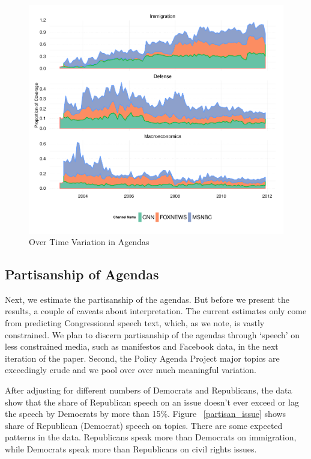 \documentclass[12pt, letterpaper]{article}
\begin{document}
\begin{figure}[H]
\centering
\caption{Over Time Variation in Agendas}\label{over_time}
\includegraphics[width=1\textwidth]{../figs/topic_channel_time.pdf}
\end{figure}

\subsection*{Partisanship of Agendas}

Next, we estimate the partisanship of the agendas. But before we present the results, a couple of caveats about interpretation. The current estimates only come from predicting Congressional speech text, which, as we note, is vastly constrained. We plan to discern partisanship of the agendas through `speech' on less constrained media, such as manifestos and Facebook data, in the next iteration of the paper. Second, the Policy Agenda Project major topics are exceedingly crude and we pool over over much meaningful variation.

After adjusting for different numbers of Democrats and Republicans, the data show that the share of Republican speech on an issue doesn't ever exceed or lag the speech by Democrats by more than 15\%. Figure ~\ref{partisan_issue} shows share of Republican (Democrat) speech on topics. There are some expected patterns in the data. Republicans speak more than Democrats on immigration, while Democrats speak more than Republicans on civil rights issues. 
\end{document}
